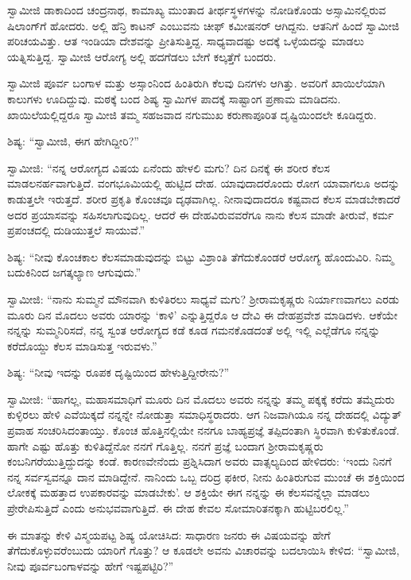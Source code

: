  ಸ್ವಾಮೀಜಿ ಡಾಕಾದಿಂದ ಚಂದ್ರನಾಥ, ಕಾಮಾಖ್ಯ ಮುಂತಾದ ತೀರ್ಥಸ್ಥಳಗಳನ್ನು ನೋಡಿಕೊಂಡು ಅಸ್ಸಾಮಿನಲ್ಲಿರುವ ಷಿಲಾಂಗ್‍ಗೆ ಹೋದರು. ಅಲ್ಲಿ ಹೆನ್ರಿ ಕಾಟನ್ ಎಂಬುವನು ಚೀಫ್ ಕಮೀಷನರ್ ಆಗಿದ್ದನು. ಆತನಿಗೆ ಹಿಂದೆ ಸ್ವಾಮೀಜಿ ಪರಿಚಯವಿತ್ತು. ಆತ ಇಂಡಿಯಾ ದೇಶವನ್ನು ಪ್ರೀತಿಸುತ್ತಿದ್ದ. ಸಾಧ್ಯವಾದಷ್ಟು ಅದಕ್ಕೆ ಒಳ್ಳೆಯದನ್ನು ಮಾಡಲು ಯತ್ನಿಸುತ್ತಿದ್ದ. ಸ್ವಾಮೀಜಿ ಆರೋಗ್ಯ ಅಲ್ಲಿ ಹದಗೆಡಲು ಬೇಗೆ ಕಲ್ಕತ್ತೆಗೆ ಬಂದರು. 

 ಸ್ವಾಮೀಜಿ ಪೂರ್ವ ಬಂಗಾಳ ಮತ್ತು ಅಸ್ಸಾಂನಿಂದ ಹಿಂತಿರುಗಿ ಕೆಲವು ದಿನಗಳು ಆಗಿತ್ತು. ಅವರಿಗೆ ಖಾಯಿಲೆಯಾಗಿ ಕಾಲುಗಳು ಊದಿದ್ದುವು. ಮಠಕ್ಕೆ ಬಂದ ಶಿಷ್ಯ ಸ್ವಾಮಿಗಳ ಪಾದಕ್ಕೆ ಸಾಷ್ಟಾಂಗ ಪ್ರಣಾಮ ಮಾಡಿದನು. ಖಾಯಿಲೆಯಲ್ಲಿದ್ದರೂ ಸ್ವಾಮೀಜಿ ತಮ್ಮ ಸಹಜವಾದ ನಗುಮುಖ ಕರುಣಾಪೂರಿತ ದೃಷ್ಟಿಯಿಂದಲೇ ಕೂಡಿದ್ದರು. 

 ಶಿಷ್ಯ: “ಸ್ವಾಮೀಜಿ, ಈಗ ಹೇಗಿದ್ದೀರಿ?” 

 ಸ್ವಾಮೀಜಿ: “ನನ್ನ ಆರೋಗ್ಯದ ವಿಷಯ ಏನೆಂದು ಹೇಳಲಿ ಮಗು? ದಿನ ದಿನಕ್ಕೆ ಈ ಶರೀರ ಕೆಲಸ ಮಾಡಲನರ್ಹವಾಗುತ್ತಿದೆ. ವಂಗಭೂಮಿಯಲ್ಲಿ ಹುಟ್ಟಿದ ದೇಹ. ಯಾವುದಾದರೊಂದು ರೋಗ ಯಾವಾಗಲೂ ಅದನ್ನು ಕಾಡುತ್ತಲೇ ಇರುತ್ತದೆ. ಶರೀರ ಪ್ರಕೃತಿ ಕೊಂಚವೂ ದೃಢವಾಗಿಲ್ಲ. ನೀನಾವುದಾದರೂ ಕಷ್ಟವಾದ ಕೆಲಸ ಮಾಡಬೇಕಾದರೆ ಅದರ ಪ್ರಯಾಸವನ್ನು ಸಹಿಸಲಾಗುವುದಿಲ್ಲ. ಆದರೆ ಈ ದೇಹವಿರುವವರೆಗೂ ನಾನು ಕೆಲಸ ಮಾಡೇ ತೀರುವೆ, ಕರ್ಮ ಪ್ರಪಂಚದಲ್ಲಿ ದುಡಿಯುತ್ತಲೆ ಸಾಯುವೆ.” 

 ಶಿಷ್ಯ: “ನೀವು ಕೊಂಚಕಾಲ ಕೆಲಸಮಾಡುವುದನ್ನು ಬಿಟ್ಟು ವಿಶ್ರಾಂತಿ ತೆಗೆದುಕೊಂಡರೆ ಆರೋಗ್ಯ ಹೊಂದುವಿರಿ. ನಿಮ್ಮ ಬದುಕಿನಿಂದ ಜಗತ್ಕಲ್ಯಾಣ ಆಗುವುದು.” 

 ಸ್ವಾಮೀಜಿ: “ನಾನು ಸುಮ್ಮನೆ ಮೌನವಾಗಿ ಕುಳಿತಿರಲು ಸಾಧ್ಯವೆ ಮಗು? ಶ‍್ರೀರಾಮಕೃಷ್ಣರು ನಿರ್ಯಾಣವಾಗಲು ಎರಡು ಮೂರು ದಿನ ಮೊದಲು ಅವರು ಯಾರನ್ನು ‘ಕಾಳಿ’ ಎನ್ನುತ್ತಿದ್ದರೊ ಆ ದೇವಿ ಈ ದೇಹಪ್ರವೇಶ ಮಾಡಿದಳು. ಆಕೆಯೇ ನನ್ನನ್ನು ಸುಮ್ಮನಿರಿಸದೆ, ನನ್ನ ಸ್ವಂತ ಆರೋಗ್ಯದ ಕಡೆ ಕೂಡ ಗಮನಕೊಡದಂತೆ ಅಲ್ಲಿ ಇಲ್ಲಿ ಎಲ್ಲೆಡೆಗೂ ನನ್ನನ್ನು ಕರೆದೊಯ್ದು ಕೆಲಸ ಮಾಡಿಸುತ್ತ ಇರುವಳು.” 

 ಶಿಷ್ಯ: “ನೀವು ಇದನ್ನು ರೂಪಕ ದೃಷ್ಟಿಯಿಂದ ಹೇಳುತ್ತಿದ್ದೀರೇನು?” 

 ಸ್ವಾಮೀಜಿ: “ಹಾಗಲ್ಲ, ಮಹಾಸಮಾಧಿಗೆ ಮೂರು ದಿನ ಮೊದಲು ಅವರು ನನ್ನನ್ನು ತಮ್ಮ ಪಕ್ಕಕ್ಕೆ ಕರೆದು ತಮ್ಮೆದುರು ಕುಳ್ಳಿರಲು ಹೇಳಿ ಎವೆಯಿಕ್ಕದೆ ನನ್ನನ್ನೇ ನೋಡುತ್ತಾ ಸಮಾಧಿಸ್ಥರಾದರು. ಆಗ ನಿಜವಾಗಿಯೂ ನನ್ನ ದೇಹದಲ್ಲಿ ವಿದ್ಯುತ್ ಪ್ರವಾಹ ಸಂಚರಿಸಿದಂತಾಯ್ತು. ಕೊಂಚ ಹೊತ್ತಿನಲ್ಲಿಯೇ ನನಗೂ ಬಾಹ್ಯಪ್ರಜ್ಞೆ ತಪ್ಪಿದಂತಾಗಿ ಸ್ಥಿರವಾಗಿ ಕುಳಿತುಕೊಂಡೆ. ಹಾಗೇ ಎಷ್ಟು ಹೊತ್ತು ಕುಳಿತಿದ್ದೆನೋ ನನಗೆ ಗೊತ್ತಿಲ್ಲ. ನನಗೆ ಪ್ರಜ್ಞೆ ಬಂದಾಗ ಶ‍್ರೀರಾಮಕೃಷ್ಣರು ಕಂಬನಿಗರೆಯುತ್ತಿದ್ದುದನ್ನು ಕಂಡೆ. ಕಾರಣವೇನೆಂದು ಪ್ರಶ್ನಿಸಿದಾಗ ಅವರು ವಾತ್ಸಲ್ಯದಿಂದ ಹೇಳಿದರು: ‘ಇಂದು ನಿನಗೆ ನನ್ನ ಸರ್ವಸ್ವವನ್ನೂ ದಾನ ಮಾಡಿದ್ದೇನೆ. ನಾನಿಂದು ಒಬ್ಬ ದರಿದ್ರ ಫಕೀರ, ನೀನು ಹಿಂತಿರುಗುವ ಮುಂಚೆ ಈ ಶಕ್ತಿಯಿಂದ ಲೋಕಕ್ಕೆ ಮಹತ್ತಾದ ಉಪಕಾರವನ್ನು ಮಾಡಬೇಕು’. ಆ ಶಕ್ತಿಯೇ ಈಗ ನನ್ನನ್ನು ಈ ಕೆಲಸವನ್ನೆಲ್ಲಾ ಮಾಡಲು ಪ್ರೇರೇಪಿಸುತ್ತಿದೆ ಎಂದು ಅನುಭವವಾಗುತ್ತಿದೆ. ಈ ದೇಹ ಕೇವಲ ಸೋಮಾರಿತನಕ್ಕಾಗಿ ಹುಟ್ಟಿಬರಲಿಲ್ಲ.” 

 ಈ ಮಾತನ್ನು ಕೇಳಿ ವಿಸ್ಮಯಪಟ್ಟ ಶಿಷ್ಯ ಯೋಚಿಸಿದ: ಸಾಧಾರಣ ಜನರು ಈ ವಿಷಯವನ್ನು ಹೇಗೆ ತೆಗೆದುಕೊಳ್ಳುವರೆಂಬುದು ಯಾರಿಗೆ ಗೊತ್ತು? ಆ ಕೂಡಲೇ ಅವನು ವಿಚಾರವನ್ನು ಬದಲಾಯಿಸಿ ಕೇಳಿದ: “ಸ್ವಾಮೀಜಿ, ನೀವು ಪೂರ್ವಬಂಗಾಳವನ್ನು ಹೇಗೆ ಇಷ್ಟಪಟ್ಟಿರಿ?” 

